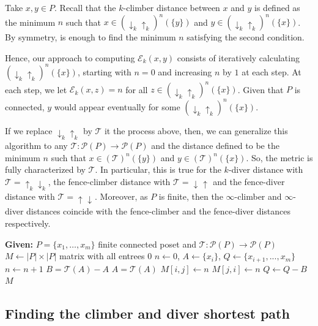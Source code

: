 \documentclass{article}[12pt]
\theoremstyle{exampstyle}
\theoremstyle{remark}
\newcommand{\E}{\mathcal{E}}
\renewcommand{\P}{\mathcal{P}}
\newcommand{\T}{\mathcal{T}}
\newcommand{\downup}[1][]{ \uparrow_{#1} \downarrow_{#1}}
\newcommand{\updown}[1][]{\downarrow_{#1} \uparrow_{#1}}
\newcommand{\tuple}[3][1]{#2_{#1}, \dots , #2_{#3}}
\begin{document}
Take $x,y \in P$. Recall that the $k$-climber distance between $x$ and $y$ is defined as the minimum $n$ such that \mbox{$x \in (\updown[k])^n(\{y\})$} and $y \in (\updown[k])^n(\{x\})$. By symmetry, is enough to find the minimum $n$ satisfying the second condition. 

Hence, our approach to computing $\E_k(x,y)$ consists of iteratively calculating $(\updown[k])^n(\{x\})$, starting with $n=0$ and increasing $n$ by $1$ at each step. At each step, we let $\E_k(x,z) = n$ for all $z \in (\updown[k])^n(\{x\})$. Given that $P$ is connected, $y$ would appear eventually for some $(\updown[k])^n(\{x\})$.

If we replace $\updown[k]$ by $\T$ it the process above, then, we can generalize this algorithm to any $\T: \P(P) \to \P(P) $ and the distance defined to be the minimum $n$ such that $x \in (\T)^n(\{y\})$ and $y \in (\T)^n(\{x\})$. So, the metric is fully characterized by $\T$. In particular, this is true for the $k$-diver distance with $\T =  \downup[k]$, the fence-climber distance with $\T =  \updown$ and the fence-diver distance with $\T =  \downup$. Moreover, as $P$ is finite, then the $\infty$-climber and $\infty$-diver distances coincide with the fence-climber and the fence-diver distances respectively.

\begin{algorithm}[h] %
\caption[Algorithm to compute distance]{Algorithm to compute distance matrix of finite connected poset $P$}
\label{alg:dis_computation}

\begin{algorithmic}[1]
\State \textbf{Given:} $P = \{\tuple{x}{m}\}$ finite connected poset and $\T: \P(P) \to \P(P) $
\State $M \gets |P| \times |P|$ matrix with all entrees 0
\State $n \gets 0$, $A \gets \{x_i\}$, $Q \gets \{x_{i+1}, ..., x_m\}$
\State $n \gets n+1$
\State $B = \T(A) - A$
\State $A = \T(A)$
\State $M[i,j] \gets n$
\State $M[j,i] \gets n$
\EndFor
\State $Q \gets Q - B$
\EndWhile
\EndFor
\State \Return $M$ 
\end{algorithmic}
\end{algorithm}

\subsection{Finding the climber and diver shortest path}
\end{document}
